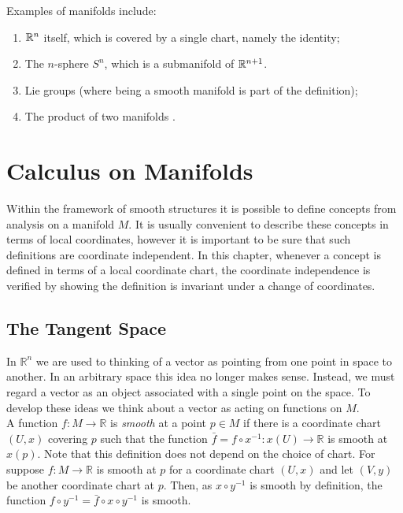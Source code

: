 Examples of manifolds include:
\begin{enumerate}
\item ${\mathbb R}^n$ itself, which is covered by a single chart, namely the identity;
\item The $n$-sphere $S^n$, which is a submanifold of ${\mathbb R}^{n+1}$.
\item Lie groups (where being a smooth manifold is part of the definition);
\item The product of two manifolds \cite{Carroll}.
\end{enumerate}

\section{Calculus on Manifolds}

Within the framework of smooth structures it is possible to define concepts from
analysis on a manifold $M$. It is usually convenient to describe these concepts
in terms of local coordinates, however it is important to be sure that such
definitions are coordinate independent. In this chapter, whenever a concept is
defined in terms of a local coordinate chart, the coordinate independence is
verified by showing the definition is invariant under a change of coordinates.\\


\subsection{The Tangent Space}\label{sec:tangentspace}
In $\mathbb{R}^n$ we are used to thinking of a vector as pointing from one point
in space to another. In an arbitrary space this idea no longer makes sense.
Instead, we must regard a vector as an object associated with a single point on
the space. To develop these ideas we think about a vector as acting on functions
on $M$.\\

A function $f:M\rightarrow\mathbb{R}$ is \textit{smooth} at a point $p\in M$ if
there is a coordinate chart $(U,x)$ covering $p$ such that the function
$\bar{f}=f\circ x^{-1}:x(U)\rightarrow \mathbb{R}$ is smooth at $x(p)$. Note
that this definition does not depend on the choice of chart. For suppose
$f:M\rightarrow\mathbb{R}$ is smooth at $p$ for a coordinate chart $(U,x)$ and
let $(V,y)$ be another coordinate chart at $p$. Then, as $x\circ y^{-1}$ is
smooth by definition, the function $f\circ y^{-1}=\bar{f}\circ x \circ y^{-1}$
is smooth.\\

